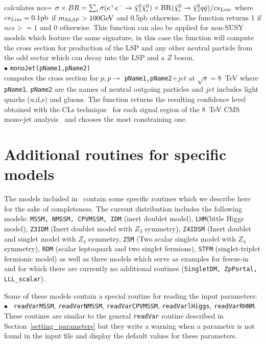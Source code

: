 \documentclass[12pt,a4paper]{article}
\begin{document}
  calculates ncs= $\sigma \times BR = \sum_i \sigma(e^+e^-\rightarrow \tilde\chi^0_1\tilde\chi^0_i)\times {\rm BR}(\tilde\chi^0_i \rightarrow \tilde\chi^0_1
q\bar{q})/cs_{Lim} $  where $cs_{Lim}=0.1{\rm pb}$  if $m_{\rm NLSP}>100{\rm GeV}$ and 0.5pb
otherwise. The function returns 1 if $ncs>=1 $ and 0 otherwise.
This function can also be applied for non-SUSY models which feature the same signature, in this case the function will compute the cross section for production of the LSP and any other neutral particle from the odd sector which can decay into the LSP and a $Z$ boson.\\[2mm]
%
\noi$\bullet$   \verb|monoJet(pName1,pName2)|\\
computes the cross section for $p,p\rightarrow$ \verb|pName1,pName2|$ +jet$ at $\sqrt{s}=8$~TeV 
where \verb|pName1|, \verb|pName2| are the names of neutral outgoing particles and $jet$ includes light quarks (u,d,s)  and gluons.
The function returns  the resulting  confidence level  obtained with the CLs technique~\cite{Read:2002hq,Read:2000ru} for each  signal region of the 8~TeV CMS mono-jet analysis~\cite{Khachatryan:2014rra} and chooses the most constraining one.



\section{Additional routines for specific models}
The models included in \micro\ contain some specific routines
which we describe here for the sake of completeness. The current 
distribution includes the following models: {\tt MSSM, NMSSM, CPVMSSM, IDM}  (inert doublet model), {\tt LHM}(little Higgs model),
  {\tt Z3IDM} (Inert doublet model with $Z_3$ symmetry), {\tt Z4IDSM} (Inert doublet and singlet model with $Z_4$ symmetry,  {\tt Z5M} (Two scalar  singlets model with $Z_4$ symmetry), {\tt RDM} (scalar leptoquark and two singlet fermions), {\tt STFM} (singlet-triplet fermionic model)  as well as three models which serve as examples for freeze-in and for which there are currently no additional routines (\verb|SingletDM, ZpPortal, LLL_scalar|).

Some of these models contain a special routine for reading the input parameters:\\
$\bullet$ \verb| readVarMSSM|, \verb|readVarNMSSM|,  \verb|readVarCPVMSSM|,
\verb|readVarlHiggs|, \verb|readVarRHNM|.\\
 These routines  are similar to the general 
\verb|readVar| routine described  in Section~\ref{setting_parameters}
but  they write a warning when a parameter is not found in the 
input file and display the default values for these parameters.
\end{document}

